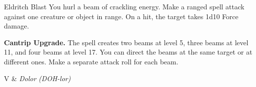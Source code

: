 \begin{Spell}[
  level=Cantrip,
  time=1 Action,
  range=120 ft,
  components={V, S},
  duration=Instantaneous,
  school=Evocation,
  attack=Ranged,
  effect=Force
]{Eldritch Blast}
You hurl a beam of crackling energy. Make a ranged spell attack against one creature or object in range. On a hit, the target takes 1d10 Force damage.

\textbf{Cantrip Upgrade.} The spell creates two beams at level 5, three beams at level 11, and four beams at level 17. You can direct the beams at the same target or at different ones. Make a separate attack roll for each beam.

\begin{components}
V & \textit{Dolor (DOH-lor)}
\end{components}
\end{Spell}


